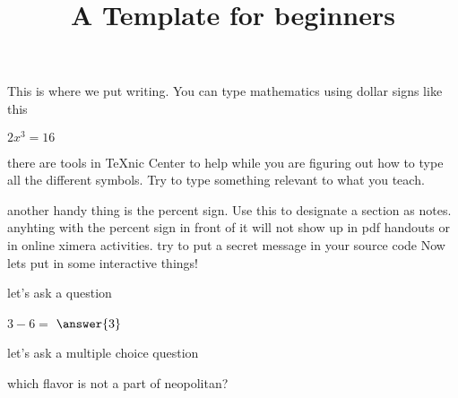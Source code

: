 \documentclass{ximera}
\title{A Template for beginners}
\begin{document}
\begin{abstract}
\end{abstract}
\maketitle
This is where we put writing. You can type mathematics using dollar signs like this
 
$2x^3=16$

there are tools in TeXnic Center to help while you are figuring out how to type all the different symbols. Try to type something relevant to what you teach.

another handy thing is the percent sign. Use this to designate a section as notes. anyhting with the percent sign in front of it will not show up in pdf handouts or in online ximera activities. try to put a secret message in your source code
Now lets put in some interactive things!

let's ask a question
\begin{question} $3-6=$ $\answer{3}$
\end{question}

let's ask a multiple choice question
\begin{question} which flavor is not a part of neopolitan?
\begin{multipleChoice}
\end{multipleChoice}
\end{question}

\end{document}
